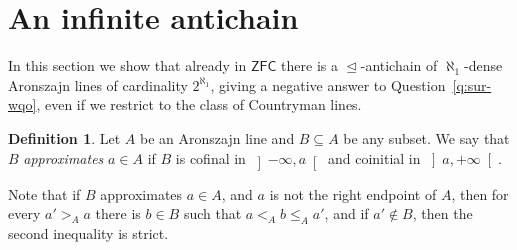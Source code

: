 \documentclass[10pt]{amsart}
\theoremstyle{definition}
\newtheorem{definition}[theorem]{Definition}
\theoremstyle{remark}
\newcommand{\seb}{\subseteq}
\newcommand{\axiom}[1]{\mathsf{#1}}
\newcommand{\ZFC}{\axiom{ZFC}}
\newcommand{\sleq}{\trianglelefteq}
\newcommand{\1}{\mathbbm{1}}
\begin{document}
\section{An infinite antichain}\label{sec:infinite-antichain}

In this section we show that already in $\ZFC$ there is a
$\sleq$-antichain of $\aleph_{1}$-dense Aronszajn lines of cardinality
$2^{\aleph_{1}}$, giving a negative answer to Question~\ref{q:sur-wqo}, even
if we restrict to the class of Countryman lines.

\begin{definition}\label{df:approximation}
  Let $A$ be an Aronszajn line and $B \seb A$ be any subset.
  We say that $B$ \emph{approximates} $a \in A$ if $B$
  is cofinal in $\left]-\infty,a\right[$ and coinitial
  in $\left]a,+\infty\right[$.
\end{definition}

Note that if $B$ approximates $a \in A$, and $a$ is not the right
endpoint of $A$, then for every $a' >_{A} a$ there is $b \in B$
such that $a <_{A} b \le_{A} a'$, and if $a' \notin B$, then
the second inequality is strict.
\end{document}
